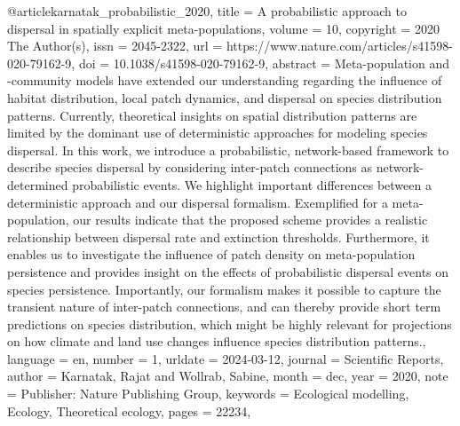 {{{{@article{karnatak_probabilistic_2020,
	title = {A probabilistic approach to dispersal in spatially explicit meta-populations},
	volume = {10},
	copyright = {2020 The Author(s)},
	issn = {2045-2322},
	url = {https://www.nature.com/articles/s41598-020-79162-9},
	doi = {10.1038/s41598-020-79162-9},
	abstract = {Meta-population and -community models have extended our understanding regarding the influence of habitat distribution, local patch dynamics, and dispersal on species distribution patterns. Currently, theoretical insights on spatial distribution patterns are limited by the dominant use of deterministic approaches for modeling species dispersal. In this work, we introduce a probabilistic, network-based framework to describe species dispersal by considering inter-patch connections as network-determined probabilistic events. We highlight important differences between a deterministic approach and our dispersal formalism. Exemplified for a meta-population, our results indicate that the proposed scheme provides a realistic relationship between dispersal rate and extinction thresholds. Furthermore, it enables us to investigate the influence of patch density on meta-population persistence and provides insight on the effects of probabilistic dispersal events on species persistence. Importantly, our formalism makes it possible to capture the transient nature of inter-patch connections, and can thereby provide short term predictions on species distribution, which might be highly relevant for projections on how climate and land use changes influence species distribution patterns.},
	language = {en},
	number = {1},
	urldate = {2024-03-12},
	journal = {Scientific Reports},
	author = {Karnatak, Rajat and Wollrab, Sabine},
	month = dec,
	year = {2020},
	note = {Publisher: Nature Publishing Group},
	keywords = {Ecological modelling, Ecology, Theoretical ecology},
	pages = {22234},
}

}}}}
